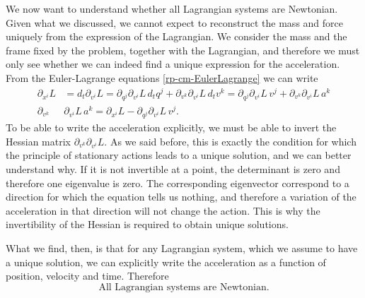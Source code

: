 We now want to understand whether all Lagrangian systems are Newtonian. Given what we discussed, we cannot expect to reconstruct the mass and force uniquely from the expression of the Lagrangian. We consider the mass and the frame fixed by the problem, together with the Lagrangian, and therefore we must only see whether we can indeed find a unique expression for the acceleration. From the Euler-Lagrange equations \ref{rp-cm-EulerLagrange} we can write
\begin{equation}
	\begin{aligned}
	\partial_{x^i}L&=d_t \partial_{v^i} L=\partial_{q^j} \partial_{v^i} L \, d_t q^j + \partial_{v^k} \partial_{v^i} L \, d_t v^k = \partial_{q^j} \partial_{v^i} L \, v^j + \partial_{v^k} \partial_{v^i} L \, a^k \\
	\partial_{v^k} &\partial_{v^i} L \, a^k = \partial_{x^i}L - \partial_{q^j} \partial_{v^i} L \, v^j .
	\end{aligned}
\end{equation}
To be able to write the acceleration explicitly, we must be able to invert the Hessian matrix $\partial_{v^k} \partial_{v^i} L$. As we said before, this is exactly the condition for which the principle of stationary actions leads to a unique solution, and we can better understand why. If it is not invertible at a point, the determinant is zero and therefore one eigenvalue is zero. The corresponding eigenvector correspond to a direction for which the equation tells us nothing, and therefore a variation of the acceleration in that direction will not change the action. This is why the invertibility of the Hessian is required to obtain unique solutions.

What we find, then, is that for any Lagrangian system, which we assume to have a unique solution, we can explicitly write the acceleration as a function of position, velocity and time. Therefore
\begin{equation}
	\textrm{All Lagrangian systems are Newtonian.}
\end{equation}

